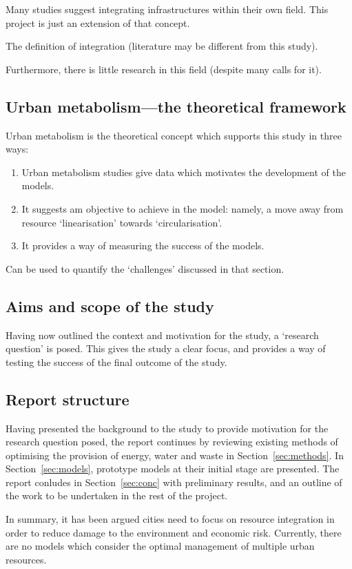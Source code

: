 Many studies suggest integrating infrastructures within their own field. This project is just an extension of that concept.

The definition of integration (literature may be different from this study).

Furthermore, there is little research in this field (despite many calls for it).  

\subsection{Urban metabolism---the theoretical framework}
Urban metabolism is the theoretical concept which supports this study in three ways:
\begin{enumerate}
	\item Urban metabolism studies give data which motivates the development of the models.
	\item It suggests am objective to achieve in the model: namely, a move away from resource `linearisation' towards `circularisation'.
	\item It provides a way of measuring the success of the models.
\end{enumerate}
Can be used to quantify the `challenges' discussed in that section.

\subsection{Aims and scope of the study}
Having now outlined the context and motivation for the study, a `research question' is posed. This gives the study a clear focus, and provides a way of testing the success of the final outcome of the study.


\subsection{Report structure}
Having presented the background to the study to provide motivation for the research question posed, the report continues by reviewing existing methods of optimising the provision of energy, water and waste in Section~\ref{sec:methods}. In Section~\ref{sec:models}, prototype models at their initial stage are presented. The report conludes in Section~\ref{sec:conc} with preliminary results, and an outline of the work to be undertaken in the rest of the project.

In summary, it has been argued cities need to focus on resource integration in order to reduce damage to the environment and economic risk. Currently, there are no models which consider the optimal management of multiple urban resources.

